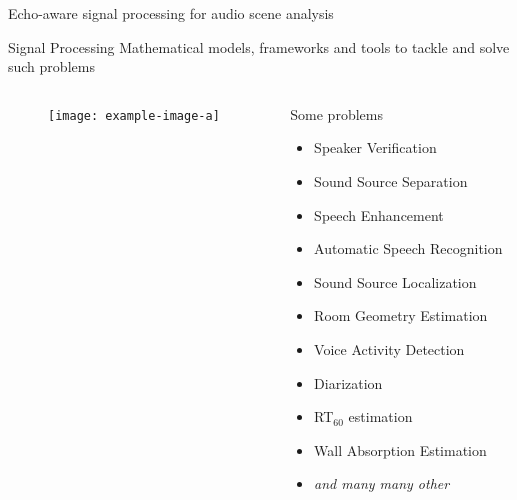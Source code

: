 \begin{frame}[t]{Echo-aware \alert{signal processing for audio scene analysis}}

    \begin{mydefblock}{Signal Processing}
        Mathematical models, frameworks and tools to tackle and solve such problems
    \end{mydefblock}

    \vfill
    \begin{columns}[onlytextwidth]
        \begin{column}{0.55\textwidth}
            \begin{figure}
                \texttt{[image: example-image-a]}
            \end{figure}
        \end{column}\hfill
        \begin{column}{0.42\textwidth}
            \small
            Some problems
            \begin{itemize}
                \item Speaker Verification
                \item Sound Source Separation 
                \item Speech Enhancement
                \item Automatic Speech Recognition\hspace{0.5em}
                \item Sound Source Localization  
                \item Room Geometry Estimation   
                \item Voice Activity Detection   
                \item Diarization                
                \item RT$_{60}$ estimation       
                \item Wall Absorption Estimation 
                \item \textit{and many many other}
            \end{itemize}


\end{column}
\end{columns}
\end{frame}
